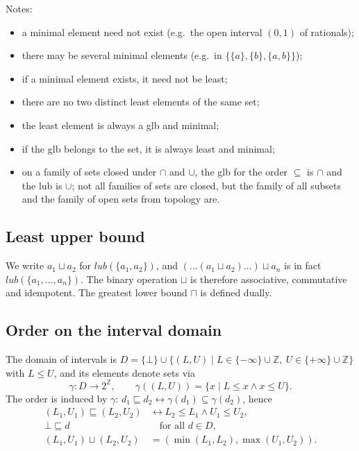 Notes:
\begin{itemize}
  \item a minimal element need not exist (e.g.\ the open interval $(0,1)$ of rationals);
  \item there may be several minimal elements (e.g.\ in $\{\{a\}, \{b\}, \{a,b\}\}$);
  \item if a minimal element exists, it need not be least;
  \item there are no two distinct least elements of the same set;
  \item the least element is always a glb and minimal;
  \item if the glb belongs to the set, it is always least and minimal;
  \item on a family of sets closed under $\cap$ and $\cup$, the glb for the order $\subseteq$ is $\cap$ and the lub is $\cup$; not all families of sets are closed, but the family of all subsets and the family of open sets from topology are.
\end{itemize}
 
\subsection*{Least upper bound}
 
 
We write $a_1 \sqcup a_2$ for $\mathit{lub}(\{a_1, a_2\})$, and $(\ldots(a_1 \sqcup a_2) \ldots) \sqcup a_n$ is in fact $\mathit{lub}(\{a_1, \ldots, a_n\})$. The binary operation $\sqcup$ is therefore associative, commutative and idempotent. The greatest lower bound $\sqcap$ is defined dually.
 
\subsection*{Order on the interval domain}
 
The domain of intervals is $D = \{\bot\} \cup \{(L, U) \mid L \in \{-\infty\} \cup \mathbb{Z},\ U \in \{+\infty\} \cup \mathbb{Z}\}$ with $L \le U$, and its elements denote sets via
\[
\gamma : D \to 2^{\mathbb{Z}}, \qquad \gamma((L, U)) = \{x \mid L \le x \wedge x \le U\}.
\]
The order is induced by $\gamma$: $d_1 \sqsubseteq d_2 \leftrightarrow \gamma(d_1) \subseteq \gamma(d_2)$, hence
\begin{align*}
(L_1, U_1) \sqsubseteq (L_2, U_2) &\leftrightarrow L_2 \le L_1 \wedge U_1 \le U_2,\\
\bot \sqsubseteq d &\quad \text{for all } d \in D,\\
(L_1, U_1) \sqcup (L_2, U_2) &= (\min(L_1, L_2), \max(U_1, U_2)).
\end{align*}
 
